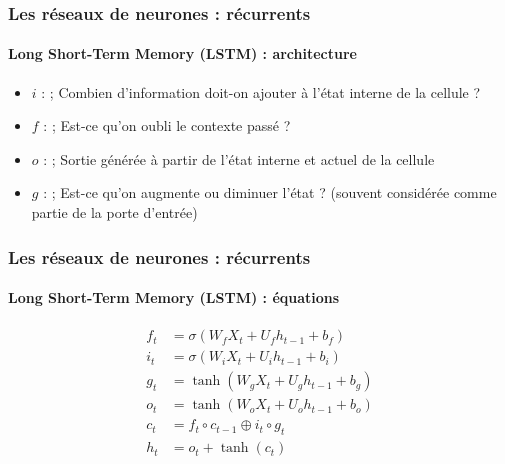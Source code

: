 \documentclass[xcolor=table]{beamer}
\begin{document}
\begin{frame}
\frametitle{Les réseaux de neurones : récurrents}
\framesubtitle{Long Short-Term Memory (LSTM) : architecture}

\begin{minipage}{0.50\textwidth} 
	\begin{itemize}
		\item $i$ :  ;
		Combien d'information doit-on ajouter à l'état interne de la cellule ?
		\item $f$ :  ;
		Est-ce qu'on oubli le contexte passé ?
		\item $o$ :  ;
		Sortie générée à partir de l'état interne et actuel de la cellule	
	\end{itemize}
\end{minipage}
%
\begin{minipage}{0.49\textwidth}
\end{minipage}

\begin{itemize}
	\item $g$ :  ;
	Est-ce qu'on augmente ou diminuer l'état ?
	(souvent considérée comme partie de la porte d'entrée)
\end{itemize}

\end{frame}

\begin{frame}
	\frametitle{Les réseaux de neurones : récurrents}
	\framesubtitle{Long Short-Term Memory (LSTM) : équations}
	
	\begin{align*}
	f_t &= \sigma(W_f X_t + U_f h_{t-1} + b_f) \\
	i_t &= \sigma(W_i X_t + U_i h_{t-1} + b_i) \\
	g_t &= \tanh(W_g X_t + U_g h_{t-1} + b_g) \\
	o_t &= \tanh(W_o X_t + U_o h_{t-1} + b_o) \\
	c_t &= f_t \circ c_{t-1} \oplus i_t \circ g_t \\
	h_t &= o_t + \tanh(c_t)
	\end{align*}
	
	
	
\end{frame}
\end{document}
